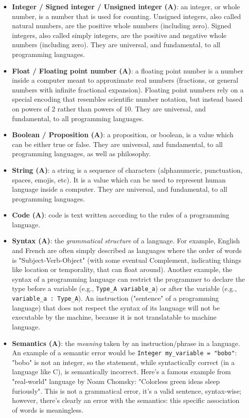 \documentclass{article}
\begin{document}
\begin{itemize}
	\item \textbf{Integer / Signed integer / Unsigned integer (A)}: an integer, or whole number, is a number that is used for counting. Unsigned integers, also called natural numbers, are the positive whole numbers (including zero). Signed integers, also called simply integers, are the positive and negative whole numbers (including zero). They are universal, and fundamental, to all programming languages.

	\item \textbf{Float / Floating point number (A)}: a floating point number is a number inside a computer meant to approximate real numbers (fractions, or general numbers with infinite fractional expansion). Floating point numbers rely on a special encoding that resembles scientific number notation, but instead based on powers of 2 rather than powers of 10. They are universal, and fundamental, to all programming languages.

	\item \textbf{Boolean / Proposition (A)}: a proposition, or boolean, is a value which can be either true or false. They are universal, and fundamental, to all programming languages, as well as philosophy.

	\item \textbf{String (A)}: a string is a sequence of characters (alphanumeric, punctuation, spaces, emojis, etc). It is a value which can be used to represent human language inside a computer. They are universal, and fundamental, to all programming languages.

	\item \textbf{Code (A)}: code is text written according to the rules of a programming language.

	\item \textbf{Syntax (A)}: the \textit{grammatical structure} of a language. For example, English and French are often simply described as languages where the order of words is "Subject-Verb-Object" (with some eventual Complement, indicating things like location or temporality, that can float around). Another example, the syntax of a programming language can restrict the programmer to declare the type before a variable (e.g., \texttt{Type\_A variable\_a}) or after the variable (e.g., \texttt{variable\_a : Type\_A}). An instruction ("sentence" of a programming language) that does not respect the syntax of its language will not be executable by the machine, because it is not translatable to machine language.

	\item \textbf{Semantics (A)}: the \textit{meaning} taken by an instruction/phrase in a language. An example of a semantic error would be \texttt{Integer my\_variable = "bobo"}: "bobo" is not an integer, so the statement, while syntactically correct (in a language like C), is semantically incorrect. Here's a famous example from "real-world" language by Noam Chomsky: "Colorless green ideas sleep furiously". This is not a grammatical error, it's a valid sentence, syntax-wise; however, there's clearly an error with the semantics: this specific association of words is meaningless.


\end{itemize}
\end{document}
